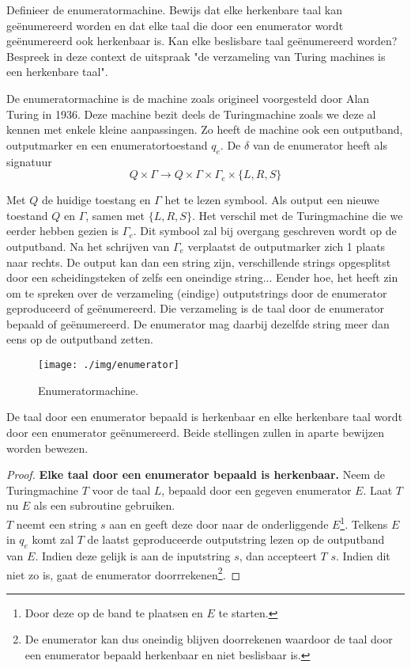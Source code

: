\begin{question}
	Definieer de enumeratormachine. Bewijs dat elke herkenbare taal kan ge\"enumereerd worden en dat elke taal die door een enumerator wordt ge\"enumereerd ook herkenbaar is. Kan elke beslisbare taal ge\"enumereerd worden? Bespreek in deze context de uitspraak "de verzameling van Turing machines is een herkenbare taal".
\end{question}

De enumeratormachine is de machine zoals origineel voorgesteld door Alan Turing in 1936. Deze machine bezit deels de Turingmachine zoals we deze al kennen met enkele kleine aanpassingen. Zo heeft de machine ook een outputband, outputmarker en een enumeratortoestand $q_e$. De $\delta$ van de enumerator heeft als signatuur $$Q \times \Gamma \rightarrow Q \times \Gamma \times \Gamma_e \times \{L,R,S\}$$

Met $Q$ de huidige toestang en $\Gamma$ het te lezen symbool. Als output een nieuwe toestand $Q$ en $\Gamma$, samen met $\{L,R,S\}$. Het verschil met de Turingmachine die we eerder hebben gezien is $\Gamma_e$. Dit symbool zal bij overgang geschreven wordt op de outputband. Na het schrijven van $\Gamma_e$ verplaatst de outputmarker zich 1 plaats naar rechts. De output kan dan een string zijn, verschillende strings opgesplitst door een scheidingsteken  of zelfs een oneindige string... Eender hoe, het heeft zin om te spreken over de verzameling (eindige) outputstrings door de enumerator geproduceerd of ge\"enumereerd. Die verzameling is de taal door de enumerator bepaald of ge\"enumereerd. De enumerator mag daarbij dezelfde string meer dan eens op de outputband zetten.

\vspace{3mm}
\begin{figure}[h!]
  \centering
      \texttt{[image: ./img/enumerator]}
  \caption{Enumeratormachine.}
\end{figure}
\vspace{3mm}

\begin{theorem}
	De taal door een enumerator bepaald is herkenbaar en elke herkenbare taal wordt door een enumerator ge\"enumereerd. Beide stellingen zullen in aparte bewijzen worden bewezen.
\end{theorem}

\begin{proof}
	\textbf{Elke taal door een enumerator bepaald is herkenbaar.} Neem de Turingmachine $T$ voor de taal $L$, bepaald door een gegeven enumerator $E$. Laat $T$ nu $E$ als een subroutine gebruiken.\\
	$T$ neemt een string $s$ aan en geeft deze door naar de onderliggende $E$\footnote{Door deze op de band te plaatsen en $E$ te starten.}. Telkens $E$ in $q_e$ komt zal $T$ de laatst geproduceerde outputstring lezen op de outputband van $E$. Indien deze gelijk is aan de inputstring $s$, dan accepteert $T$ $s$. Indien dit niet zo is, gaat de enumerator doorrrekenen\footnote{De enumerator kan dus oneindig blijven doorrekenen waardoor de taal door een enumerator bepaald herkenbaar en niet beslisbaar is.}.
\end{proof}

